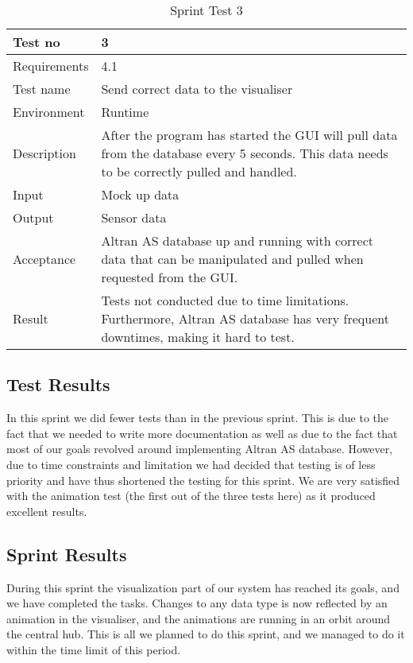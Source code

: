\documentclass[../document]{subfiles}
\begin{document}
\begin{table}[H]
\caption{Sprint Test 3}
\centering
\begin{tabularx}{\textwidth}{|l|X|}
\hline
Test no
&3
\\ \hline Requirements
&4.1
\\ \hline Test name
&Send correct data to the visualiser
\\ \hline Environment
&Runtime
\\ \hline Description
&After the program has started the GUI will pull data from the database every 5 seconds. This data needs to be correctly pulled and handled.
\\ \hline Input
&Mock up data
\\ \hline Output
&Sensor data
\\ \hline Acceptance
&\gls{Altran} AS database up and running with correct data that can be manipulated and pulled when requested from the GUI. 
\\ \hline Result
&Tests not conducted due to time limitations. Furthermore, \gls{Altran} AS database has very frequent downtimes, making it hard to test.
\\ \hline 
\end{tabularx}
\end{table}

\subsection{Test Results}
In this sprint we did fewer tests than in the previous sprint. This is due to the fact that we needed to write more documentation as well as due to the fact that most of our goals revolved around implementing \gls{Altran} AS database. However, due to time constraints and limitation we had decided that testing is of less priority and have thus shortened the testing for this sprint. We are very satisfied with the animation test (the first out of the three tests here) as it produced excellent results.

\subsection{Sprint Results}
During this sprint the visualization part of our system has reached its goals, and we have completed the tasks. Changes to any data type is now reflected by an animation in the visualiser, and the animations are running in an orbit around the central hub. This is all we planned to do this sprint, and we managed to do it within the time limit of this period. 
\end{document}
